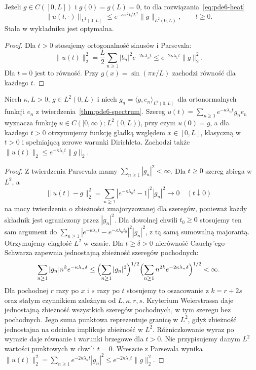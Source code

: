 \begin{wniosek}
\label{cor:pde6-decay}
Jeżeli $g\in C([0,L])$ i $g(0)=g(L)=0$, to dla
rozwiązania~\eqref{eq:pde6-heat}
\begin{equation}\label{eq:pde6-decay}
 \|u(t,\cdot)\|_{L^2(0,L)}
 \le e^{-\kappa\pi^2t/L^2}\|g\|_{L^2(0,L)},\qquad t\ge0.
\end{equation}
Stała w wykładniku jest optymalna.
\end{wniosek}
\begin{proof}
Dla $t>0$ stosujemy ortogonalność sinusów i Parsevala:
\[
\|u(t)\|_2^2=\frac L2\sum_{n\ge1}|b_n|^2e^{-2\kappa\lambda_nt}
\le e^{-2\kappa\lambda_1t}\|g\|_2^2.
\]
Dla $t=0$ jest to równość. Przy $g(x)=\sin(\pi x/L)$
zachodzi równość dla każdego $t$.
\end{proof}


\begin{stwierdzenie}
\label{prop:pde6-L2-semigroup}
Niech $\kappa,L>0$, $g\in L^2(0,L)$ i niech
$g_n=\langle g,e_n\rangle_{L^2(0,L)}$ dla ortonormalnych
funkcji $e_n$ z twierdzenia~\ref{thm:pde6-spectrum}.
Szereg $u(t)=\sum_{n\ge1}e^{-\kappa\lambda_nt}g_ne_n$
wyznacza funkcję $u\in C([0,\infty);L^2(0,L))$,
przy czym $u(0)=g$, a dla każdego $t>0$ otrzymujemy
funkcję gładką względem $x\in[0,L]$, klasyczną
w $t>0$ i spełniającą zerowe warunki Dirichleta.
Zachodzi także $\|u(t)\|_2\le e^{-\kappa\lambda_1t}\|g\|_2$.
\end{stwierdzenie}
\begin{proof}
Z twierdzenia Parsevala mamy $\sum_{n\ge1}|g_n|^2<\infty$.
Dla $t\ge0$ szereg zbiega w $L^2$, a
\[
 \|u(t)-g\|_2^2=\sum_{n\ge1}
 |e^{-\kappa\lambda_nt}-1|^2|g_n|^2\longrightarrow0
 \quad(t\downarrow0)
\]
na mocy twierdzenia o zbieżności zmajoryzowanej
dla szeregów, ponieważ każdy składnik jest ograniczony
przez $|g_n|^2$. Dla dowolnej chwili $t_0\ge0$
stosujemy ten sam argument do
$\sum_{n\ge1}|e^{-\kappa\lambda_nt}-e^{-\kappa\lambda_nt_0}|^2
|g_n|^2$, z tą samą sumowalną majorantą.
Otrzymujemy ciągłość $L^2$ w czasie.
Dla $t\ge\delta>0$ nierówność Cauchy'ego--Schwarza
zapewnia jednostajną zbieżność szeregów pochodnych:
\[
 \sum_{n\ge1}|g_n|n^k e^{-\kappa\lambda_n\delta}
 \le\Bigl(\sum_{n\ge1}|g_n|^2\Bigr)^{1/2}
 \Bigl(\sum_{n\ge1}n^{2k}e^{-2\kappa\lambda_n\delta}\Bigr)^{1/2}
 <\infty.
\]
Dla pochodnej $r$ razy po $x$ i $s$ razy po $t$
stosujemy to oszacowanie z $k=r+2s$ oraz stałym
czynnikiem zależnym od $L,\kappa,r,s$. Kryterium
Weierstrassa daje jednostajną zbieżność wszystkich
szeregów pochodnych, w tym szeregu bez pochodnych.
Jego suma punktowa reprezentuje granicę w $L^2$,
gdyż zbieżność jednostajna na odcinku implikuje
zbieżność w $L^2$. Różniczkowanie wyraz po wyrazie
daje równanie i warunki brzegowe dla $t>0$.
Nie przypisujemy danym $L^2$ wartości punktowych
w chwili $t=0$. Wreszcie z Parsevala wynika
$\|u(t)\|_2^2=\sum_{n\ge1}e^{-2\kappa\lambda_nt}|g_n|^2
\le e^{-2\kappa\lambda_1t}\|g\|_2^2$.
\end{proof}

